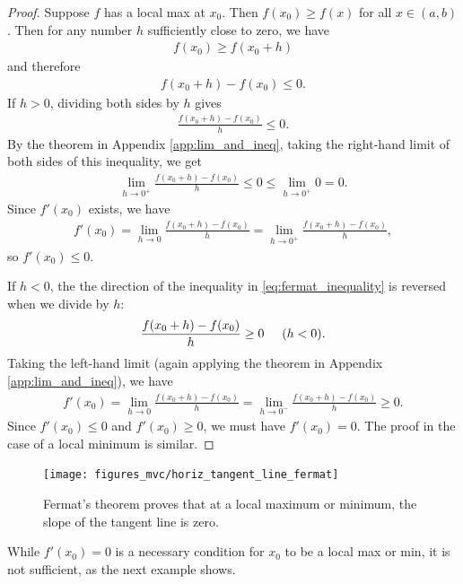 \documentclass[12pt,letterpaper,reqno]{article}
\numberwithin{equation}{section}
\begin{document}
{\begin{proof}
	Suppose $f$ has a local max at $x_0$. Then $f(x_0)\geq f(x)$ for all $x \in (a,b)$. Then for any number $h$ sufficiently close to zero, we have
	\begin{align*}
		f(x_0) \geq f(x_0+h)
	\end{align*}
	and therefore
	\begin{align}\label{eq:fermat_inequality}
		f(x_0+h)-f(x_0) \leq 0.
	\end{align}
	If $h>0$, dividing both sides by $h$ gives
	\begin{align*}
		\frac{f(x_0+h)-f(x_0)}{h}\leq 0.
	\end{align*}
	By the theorem in Appendix \ref{app:lim_and_ineq}, taking the right-hand limit of both sides of this inequality, we get
	\begin{align*}
		\lim_{h \to 0^+}\frac{f(x_0+h)-f(x_0)}{h}\leq 0 \leq \lim_{h \to 0^+}0=0.
	\end{align*}
	Since $f'(x_0)$ exists, we have
	\begin{align*}
		f'(x_0)=\lim_{h \to 0}\frac{f(x_0+h)-f(x_0)}{h}=\lim_{h \to 0^+}\frac{f(x_0+h)-f(x_0)}{h},
	\end{align*}
	so $f'(x_0) \leq 0$.
	
	If $h<0$, the the direction of the inequality in \eqref{eq:fermat_inequality} is reversed when we divide by $h$:
	\begin{align*}
		\frac{f(x_0+h)-f(x_0)}{h} \geq 0 \hspace{0.5cm} (h<0).
	\end{align*}
	Taking the left-hand limit (again applying the theorem in Appendix \ref{app:lim_and_ineq}), we have
	\begin{align*}
		f'(x_0)=\lim_{h \to 0}\frac{f(x_0+h)-f(x_0)}{h}=\lim_{h \to 0^-}\frac{f(x_0+h)-f(x_0)}{h}\geq 0.
	\end{align*}
	Since $f'(x_0) \leq 0$ and $f'(x_0)\geq 0$, we must have $f'(x_0)=0$. The proof in the case of a local minimum is similar.
\end{proof}

\begin{figure}[h]
	\centering
	\texttt{[image: figures\_mvc/horiz\_tangent\_line\_fermat]}
	\caption{Fermat's theorem proves that at a local maximum or minimum, the slope of the tangent line is zero.}
\end{figure}

While $f'(x_0)=0$ is a necessary condition for $x_0$ to be a local max or min, it is not sufficient, as the next example shows.

}
\end{document}
